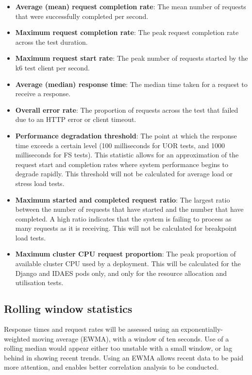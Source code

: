 \begin{itemize}[itemsep=0pt]
    \item \textbf{Average (mean) request completion rate}: The mean number of requests that were successfully completed per second.
    \item \textbf{Maximum request completion rate}: The peak request completion rate across the test duration.
    \item \textbf{Maximum request start rate}: The peak number of requests started by the k6 test client per second.
    \item \textbf{Average (median) response time}: The median time taken for a request to receive a response.
    \item \textbf{Overall error rate}: The proportion of requests across the test that failed due to an HTTP error or client timeout.
    \item \textbf{Performance degradation threshold}: The point at which the response time exceeds a certain level (100 milliseconds for UOR tests, and 1000 milliseconds for FS tests). This statistic allows for an approximation of the request start and completion rates where system performance begins to degrade rapidly. This threshold will not be calculated for average load or stress load tests.
    \item \textbf{Maximum started and completed request ratio}: The largest ratio between the number of requests that have started and the number that have completed. A high ratio indicates that the system is failing to process as many requests as it is receiving. This will not be calculated for breakpoint load tests.
    \item \textbf{Maximum cluster CPU request proportion}: The peak proportion of available cluster CPU used by a deployment. This will be calculated for the Django and IDAES pods only, and only for the resource allocation and utilisation tests.
\end{itemize}

\subsection{Rolling window statistics}

Response times and request rates will be assessed using an exponentially-weighted moving average (EWMA), with a window of ten seconds. Use of a rolling median would appear either too unstable with a small window, or lag behind in showing recent trends. Using an EWMA allows recent data to be paid more attention, and enables better correlation analysis to be conducted.

